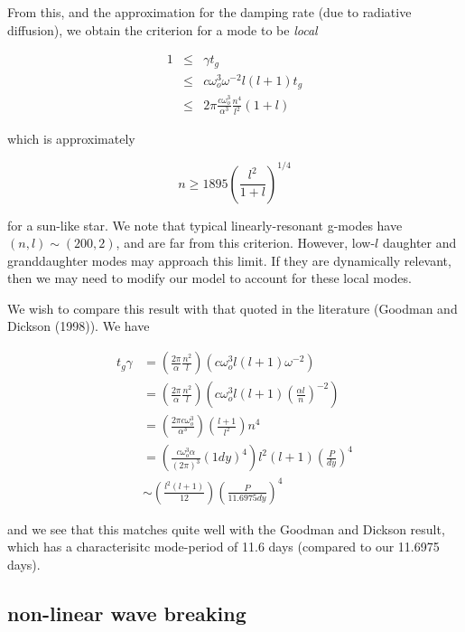 From this, and the approximation for the damping rate (due to radiative diffusion), we obtain the criterion for a mode to be \emph{local}

\begin{eqnarray}
1 & \leq & \gamma t_g \\
  & \leq & c \omega_o^3 \omega^{-2} l(l+1) t_g \\
  & \leq & 2\pi \frac{c \omega_o^3}{\alpha^3} \frac{n^4}{l^2} (1+l)
\end{eqnarray}

which is approximately

\begin{equation}
n \geq 1895 \left(\frac{l^2}{1+l}\right)^{1/4}
\end{equation}

for a sun-like star. We note that typical linearly-resonant g-modes have $(n,l)\sim(200,2)$, and are far from this criterion. However, low-$l$ daughter and granddaughter modes may approach this limit. If they are dynamically relevant, then we may need to modify our model to account for these local modes.

We wish to compare this result with that quoted in the literature (Goodman and Dickson (1998)). We have

\begin{subequations}
\begin{align}
t_g \gamma & = \left(\frac{2\pi}{\alpha}\frac{n^2}{l}\right) \left(c \omega_o^3 l(l+1) \omega^{-2} \right) \\
           & = \left(\frac{2\pi}{\alpha}\frac{n^2}{l}\right) \left(c \omega_o^3 l(l+1) \left(\frac{\alpha l}{n} \right)^{-2} \right) \\
           & = \left(\frac{2\pi c \omega_o^3}{\alpha^3}\right)\left(\frac{l+1}{l^2}\right) n^4 \\
           & = \left(\frac{c \omega_o^3 \alpha}{(2\pi)^3} (1dy)^4\right) l^2 (l+1) \left( \frac{P}{dy}\right)^4 \\
           & \sim \left(\frac{l^2(l+1)}{12} \right) \left( \frac{P}{11.6975 dy} \right)^4
\end{align}
\end{subequations}

and we see that this matches quite well with the Goodman and Dickson result, which has a characterisitc mode-period of 11.6 days (compared to our 11.6975 days).

\subsection*{non-linear wave breaking}

